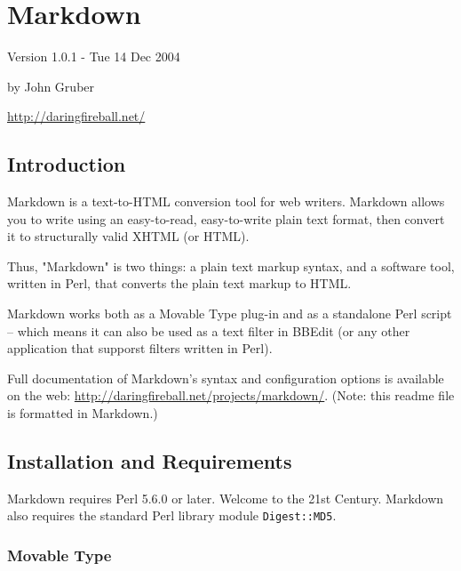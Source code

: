 \section*{Markdown}




Version 1.0.1 - Tue 14 Dec 2004



by John Gruber


\href{http://daringfireball.net/}{http://daringfireball.net/}

\subsection*{Introduction}




Markdown is a text-to-HTML conversion tool for web writers. Markdown
allows you to write using an easy-to-read, easy-to-write plain text
format, then convert it to structurally valid XHTML (or HTML).



Thus, "Markdown" is two things: a plain text markup syntax, and a
software tool, written in Perl, that converts the plain text markup 
to HTML.



Markdown works both as a Movable Type plug-in and as a standalone Perl
script -- which means it can also be used as a text filter in BBEdit
(or any other application that supporst filters written in Perl).



Full documentation of Markdown's syntax and configuration options is
available on the web: \href{http://daringfireball.net/projects/markdown/}{http://daringfireball.net/projects/markdown/}.
(Note: this readme file is formatted in Markdown.)

\subsection*{Installation and Requirements}




Markdown requires Perl 5.6.0 or later. Welcome to the 21st Century.
Markdown also requires the standard Perl library module \texttt{Digest::MD5}.

\subsubsection*{Movable Type}




